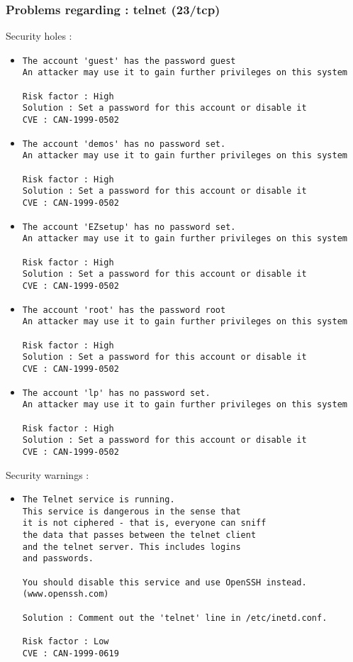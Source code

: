 \documentclass{article}
\begin{document}
\subsubsection{Problems regarding : telnet (23/tcp)}
Security holes :\\
\begin{itemize}
\item \begin{verbatim}
The account 'guest' has the password guest
An attacker may use it to gain further privileges on this system

Risk factor : High
Solution : Set a password for this account or disable it
CVE : CAN-1999-0502
\end{verbatim}\item \begin{verbatim}
The account 'demos' has no password set. 
An attacker may use it to gain further privileges on this system

Risk factor : High
Solution : Set a password for this account or disable it
CVE : CAN-1999-0502
\end{verbatim}\item \begin{verbatim}
The account 'EZsetup' has no password set. 
An attacker may use it to gain further privileges on this system

Risk factor : High
Solution : Set a password for this account or disable it
CVE : CAN-1999-0502
\end{verbatim}\item \begin{verbatim}
The account 'root' has the password root
An attacker may use it to gain further privileges on this system

Risk factor : High
Solution : Set a password for this account or disable it
CVE : CAN-1999-0502
\end{verbatim}\item \begin{verbatim}
The account 'lp' has no password set. 
An attacker may use it to gain further privileges on this system

Risk factor : High
Solution : Set a password for this account or disable it
CVE : CAN-1999-0502
\end{verbatim}\end{itemize}
Security warnings :\\
\begin{itemize}
\item \begin{verbatim}
The Telnet service is running.
This service is dangerous in the sense that
it is not ciphered - that is, everyone can sniff
the data that passes between the telnet client
and the telnet server. This includes logins
and passwords.

You should disable this service and use OpenSSH instead.
(www.openssh.com)

Solution : Comment out the 'telnet' line in /etc/inetd.conf.

Risk factor : Low
CVE : CAN-1999-0619
\end{verbatim}\end{itemize}
\end{document}
